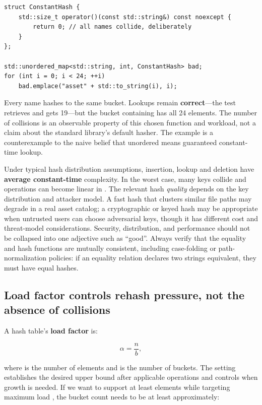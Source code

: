 \begin{verbatim}
struct ConstantHash {
    std::size_t operator()(const std::string&) const noexcept {
        return 0; // all names collide, deliberately
    }
};

std::unordered_map<std::string, int, ConstantHash> bad;
for (int i = 0; i < 24; ++i)
    bad.emplace("asset" + std::to_string(i), i);
\end{verbatim}

Every name hashes to the same bucket. Lookups remain \textbf{correct}---the test retrieves  and gets 19---but the bucket containing  has all 24 elements. The number of collisions is an observable property of this chosen function and workload, not a claim about the standard library's default hasher. The example is a counterexample to the naive belief that unordered means guaranteed constant-time lookup.

Under typical hash distribution assumptions, insertion, lookup and deletion have \textbf{average constant-time} complexity. In the worst case, many keys collide and operations can become linear in . The relevant hash \emph{quality} depends on the key distribution and attacker model. A fast hash that clusters similar file paths may degrade in a real asset catalog; a cryptographic or keyed hash may be appropriate when untrusted users can choose adversarial keys, though it has different cost and threat-model considerations. Security, distribution, and performance should not be collapsed into one adjective such as ``good''. Always verify that the equality and hash functions are mutually consistent, including case-folding or path-normalization policies: if an equality relation declares two strings equivalent, they must have equal hashes.

\subsection{Load factor controls rehash pressure, not the absence of collisions}\label{05-engine-i-ch005-load-factor-controls-rehash-pressure-not-the-absence-of-collisions}

\hypertarget{05-engine-i-ch005-load-factor-controls-rehash-pressure-not-the-absence-of-collisions}{}

A hash table's \textbf{load factor} is:

\[
\alpha = \frac{n}{b},
\]

where  is the number of elements and  is the number of buckets. The  setting establishes the desired upper bound after applicable operations and controls when growth is needed. If we want to support at least  elements while targeting maximum load , the bucket count needs to be at least approximately:

